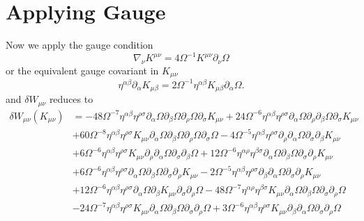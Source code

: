 \documentclass[10pt,letterpaper]{article}
\begin{document}
\section*{Applying Gauge}
Now we apply the gauge condition
\begin{equation}
	 \nabla_\nu  K^{\mu\nu} = 4\Omega^{-1}K^{\mu\nu}\partial_\nu \Omega
\end{equation}
or the equivalent gauge covariant in $K_{\mu\nu}$ 
\begin{equation}
	\eta^{\alpha\beta}\partial_\alpha K_{\mu\beta} = 2\Omega^{-1}\eta^{\alpha\beta}K_{\mu\beta}\partial_\alpha \Omega.
\end{equation}
and $\delta W_{\mu\nu}$ reduces to
\begin{align}
	\delta  W_{\mu\nu}(K_{\mu\nu})&= 
- 48\Omega^{-7} \eta^{\alpha \beta} \eta^{\rho \sigma} \partial_{\alpha}\Omega \partial_{\beta}\Omega \partial_{\rho}\Omega \partial_{\sigma}K_{\mu \nu} + 24\Omega^{-6} \eta^{\alpha \beta} \eta^{\rho \sigma} \partial_{\alpha}\Omega \partial_{\rho}\partial_{\beta}\Omega \partial_{\sigma}K_{\mu \nu} \nonumber\\
& + 60\Omega^{-8} \eta^{\alpha \beta} \eta^{\rho \sigma} K_{\mu \nu} \partial_{\alpha}\Omega \partial_{\beta}\Omega \partial_{\rho}\Omega \partial_{\sigma}\Omega - 4\Omega^{-5} \eta^{\alpha \beta} \eta^{\rho \sigma} \partial_{\rho}\partial_{\alpha}\Omega \partial_{\sigma}\partial_{\beta}K_{\mu \nu} \nonumber \\
&+ 6\Omega^{-6} \eta^{\alpha \beta} \eta^{\rho \sigma} K_{\mu \nu} \partial_{\rho}\partial_{\alpha}\Omega \partial_{\sigma}\partial_{\beta}\Omega + 12\Omega^{-6} \eta^{\alpha \rho} \eta^{\beta \sigma} \partial_{\alpha}\Omega \partial_{\beta}\Omega \partial_{\sigma}\partial_{\rho}K_{\mu \nu}\nonumber\\
& + 6 \Omega^{-6}\eta^{\alpha \beta} \eta^{\rho \sigma} \partial_{\alpha}\Omega \partial_{\beta}\Omega \partial_{\sigma}\partial_{\rho}K_{\mu \nu} - 2\Omega^{-5} \eta^{\alpha \beta} \eta^{\rho \sigma} \partial_{\beta}\partial_{\alpha}\Omega \partial_{\sigma}\partial_{\rho}K_{\mu \nu}  \nonumber \\
&+ 12\Omega^{-6} \eta^{\alpha \beta} \eta^{\rho \sigma} \partial_{\alpha}\Omega \partial_{\beta}K_{\mu \nu} \partial_{\sigma}\partial_{\rho}\Omega -  48\Omega^{-7} \eta^{\alpha \rho} \eta^{\beta \sigma} K_{\mu \nu} \partial_{\alpha}\Omega \partial_{\beta}\Omega \partial_{\sigma}\partial_{\rho}\Omega\nonumber\\
 &-  24\Omega^{-7} \eta^{\alpha \beta} \eta^{\rho \sigma} K_{\mu \nu} \partial_{\alpha}\Omega \partial_{\beta}\Omega \partial_{\sigma}\partial_{\rho}\Omega  + 3\Omega^{-6} \eta^{\alpha \beta} \eta^{\rho \sigma} K_{\mu \nu} \partial_{\beta}\partial_{\alpha}\Omega \partial_{\sigma}\partial_{\rho}\Omega\nonumber\\

\end{align}
\end{document}
